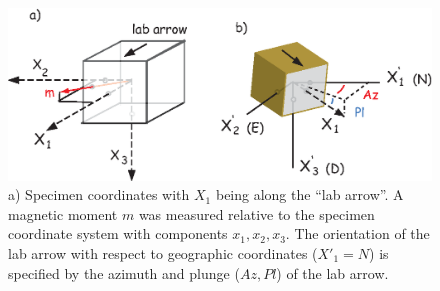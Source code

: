 \begin{figure}[h!tb]
\centering  \includegraphics[width=12 cm]{EPSfiles/digeo.eps}
\caption{a) Specimen coordinates with $X_1$ being along the ``lab arrow''.  A magnetic moment $m$ was measured relative to the specimen coordinate system with components $x_1, x_2, x_3$.  The orientation of the lab arrow with respect to geographic coordinates ($X'_1 = N$) is specified by the azimuth and plunge ($Az, Pl$) of the lab arrow. }
\label{fig:digeo}
\end{figure}

